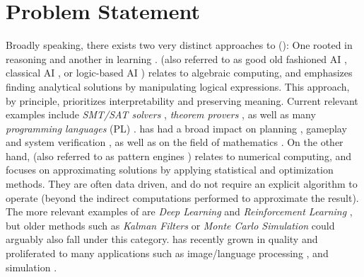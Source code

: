 \chapter{Problem Statement} \label{Chapter:Problem Statement}

Broadly speaking, there exists  two very distinct approaches to \emph{\AILong{}}  (\emph{\AI{}}): One rooted in reasoning and another in learning \citep{Platzer_2024, booch2021thinking}.  \SiAI{} (also referred to as good old fashioned AI \citep{haugeland1989artificial}, classical AI \citep{garnelo2019reconciling},  or logic-based AI \citep{thomason2003logic}) relates to algebraic computing, and emphasizes finding analytical solutions by manipulating logical expressions. This approach, by principle, prioritizes interpretability and preserving meaning. Current relevant examples include \emph{SMT/SAT solvers} \citep{barrett2018satisfiability, alyahya2022structure}, \emph{theorem provers} \citep{bartek2025vampire, barras1999coq},  as well as many \emph{programming languages} (PL) \citep{korner2022fifty, perkel2019julia, klabnik2023rust}.
 \SiAI{} has had a broad impact on planning \citep{geffner2013concise}, gameplay \citep{newell1958chess} and system verification \citep{leroy2016compcert, tihanyi2025new}, as well as on the field of mathematics \cite{Blokpoel2024}.  On the other hand, \SuAI{} (also referred to as pattern engines \citep{julia2020there})
relates to numerical computing,  and focuses on approximating solutions by applying statistical and optimization methods. They are often data driven, and do not require an explicit algorithm to operate (beyond the indirect computations performed to approximate the result). The more relevant examples of \SuAI{} are \emph{Deep Learning} \citep{norvig2002modern} and \emph{Reinforcement Learning} \citep{sutton1998reinforcement}, but older methods such as \emph{Kalman Filters} \citep{simon2001kalman} or \emph{Monte Carlo Simulation} \citep{martin2024computing} could arguably also fall under this category.  \SuAI{} has recently grown in quality and proliferated to many applications such as image/language processing \mcita{}, and simulation \mcita{}. 

